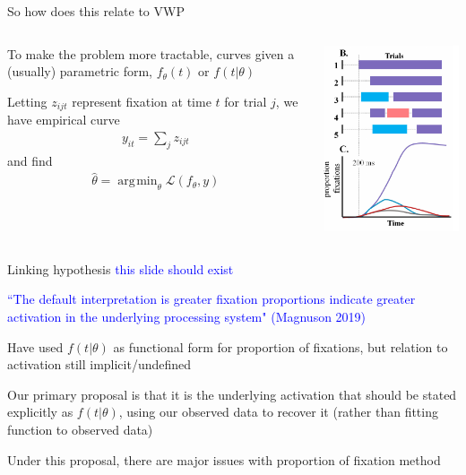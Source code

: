 \documentclass{beamer}
\DeclareMathOperator*{\argmin}{arg\!\min}
\newcommand{\vp}{\vspace{2mm}}
\providecommand{\cn}[1]{\textcolor{blue}{#1}}
\begin{document}
\begin{frame}{So how does this relate to VWP}

\begin{columns}
\begin{column}{0.45\textwidth}
To make the problem more tractable, curves given a (usually) parametric form, $f_{\theta}(t)$ or $f(t| \theta)$ \\ \vspace{2mm}

Letting $z_{ijt}$ represent fixation at time $t$ for trial $j$, we have empirical curve
\begin{align*}
y_{it} = \sum_j z_{ijt}
\end{align*}
and find
\begin{align*}
\hat{\theta} = \argmin_{\theta} \mathcal{L}(f_{\theta}, y)
\end{align*}

\end{column}
\begin{column}{0.5\textwidth}  %
\begin{center}
\includegraphics[scale=0.5]{img/bob_aggregate.png}
\end{center}
\end{column}
\end{columns}
\end{frame}

\begin{frame}{Linking hypothesis}
\cn{this slide should exist} \vp

\cn{``The default interpretation is greater fixation proportions indicate greater activation in the underlying processing system" (Magnuson 2019)} \vp

Have used $f(t|\theta)$ as functional form for proportion of fixations, but relation to activation still implicit/undefined \vp

Our primary proposal is that it is the underlying activation that should be stated explicitly as $f(t|\theta)$, using our observed data to recover it (rather than fitting function to observed data) \vp

Under this proposal, there are major issues with proportion of fixation method



\end{frame}
\end{document}
